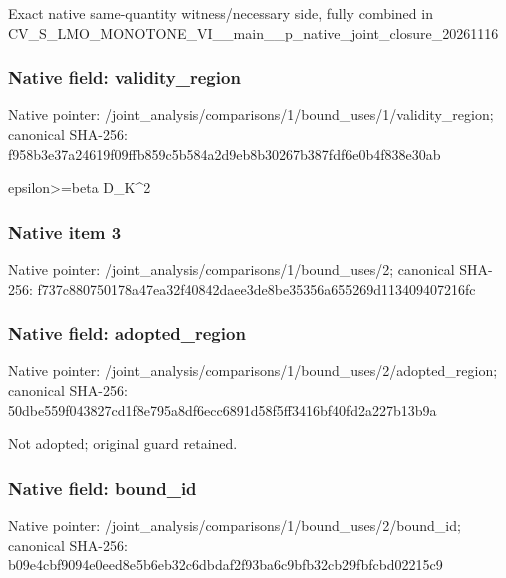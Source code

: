 \documentclass[10pt,a4paper]{article}
\begin{document}
\begingroup\raggedright\sloppy Exact native same-quantity witness/\allowbreak{}necessary side,\allowbreak{} fully combined in CV\_\allowbreak{}S\_\allowbreak{}LMO\_\allowbreak{}MONOTONE\_\allowbreak{}VI\_\allowbreak{}\_\allowbreak{}main\_\allowbreak{}\_\allowbreak{}p\_\allowbreak{}native\_\allowbreak{}joint\_\allowbreak{}closure\_\allowbreak{}20261116\par\endgroup

\subsubsection{Native field: validity\_\allowbreak{}region}
Native pointer: /joint\_\allowbreak{}analysis/comparisons/1/bound\_\allowbreak{}uses/1/validity\_\allowbreak{}region; canonical SHA-256: f958b3e37a24619f09ffb859c5b584a2d9eb8b30267b387fdf6e0b4f838e30ab

\begingroup\raggedright\sloppy epsilon>=\allowbreak{}beta D\_\allowbreak{}K\textasciicircum{}2\par\endgroup

\subsubsection{Native item 3}
Native pointer: /joint\_\allowbreak{}analysis/comparisons/1/bound\_\allowbreak{}uses/2; canonical SHA-256: f737c880750178a47ea32f40842daee3de8be35356a655269d113409407216fc

\subsubsection{Native field: adopted\_\allowbreak{}region}
Native pointer: /joint\_\allowbreak{}analysis/comparisons/1/bound\_\allowbreak{}uses/2/adopted\_\allowbreak{}region; canonical SHA-256: 50dbe559f043827cd1f8e795a8df6ecc6891d58f5ff3416bf40fd2a227b13b9a

\begingroup\raggedright\sloppy Not adopted;\allowbreak{} original guard retained.\par\endgroup

\subsubsection{Native field: bound\_\allowbreak{}id}
Native pointer: /joint\_\allowbreak{}analysis/comparisons/1/bound\_\allowbreak{}uses/2/bound\_\allowbreak{}id; canonical SHA-256: b09e4cbf9094e0eed8e5b6eb32c6dbdaf2f93ba6c9bfb32cb29fbfcbd02215c9
\end{document}
